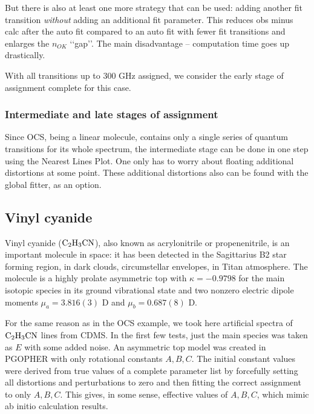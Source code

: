 \documentclass[11pt]{article}
\begin{document}
But there is also at least one more strategy that can be used: adding another fit transition \emph{without} adding an additional fit parameter. This reduces obs minus calc after the auto fit compared to an auto fit with fewer fit transitions and enlarges the $n_{OK}$ \lq\lq{}gap\rq\rq{}. The main disadvantage -- computation time goes up drastically. %


With all transitions up to 300 GHz assigned, we consider the early stage of assignment complete for this case.

\subsubsection{Intermediate and late stages of assignment}

Since OCS, being a linear molecule, contains only a single series of quantum transitions for its whole spectrum, the intermediate stage can be done in one step using the Nearest Lines Plot. One only has to worry about floating additional distortions at some point. These additional distortions also can be found with the global fitter, as an option.

\subsection{Vinyl cyanide}

Vinyl cyanide ($\rm C_2H_3CN$), also known as acrylonitrile or propenenitrile, is an important molecule in space: it has been detected in the Sagittarius B2 star forming region, in dark clouds, circumstellar envelopes, in Titan atmosphere. The molecule is a highly prolate asymmetric top with $\kappa = -0.9798$ for the main isotopic species in its ground vibrational state and two nonzero electric dipole moments $\mu_a = 3.816(3)$ D and $\mu_b = 0.687(8)$ D.  


For the same reason as in the OCS example, we took here artificial spectra of $\rm C_2H_3CN$ lines from CDMS. In the first few tests, just the main species was taken as $E$ with some added noise. An asymmetric top model was created in PGOPHER with only rotational constants $A, B, C$. The initial constant values were derived from true values of a complete parameter list by forcefully setting all distortions and perturbations to zero and then fitting the correct assignment to only $A, B, C$. This gives, in some sense, effective values of $A, B, C$, which mimic ab initio calculation results. %
\end{document}
